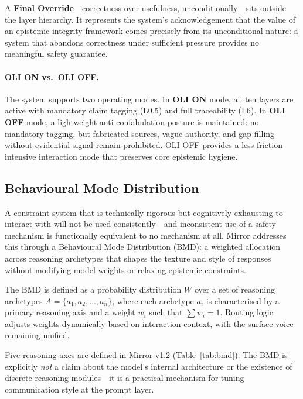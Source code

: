 \documentclass[11pt,a4paper]{article}
\begin{document}
A \textbf{Final Override}---correctness over usefulness, unconditionally---sits outside the layer hierarchy.
It represents the system's acknowledgement that the value of an epistemic integrity framework comes precisely from its unconditional nature: a system that abandons correctness under sufficient pressure provides no meaningful safety guarantee.

\paragraph{OLI ON vs.\ OLI OFF.}
The system supports two operating modes.
In \textbf{OLI ON} mode, all ten layers are active with mandatory claim tagging (L0.5) and full traceability (L6).
In \textbf{OLI OFF} mode, a lightweight anti-confabulation posture is maintained: no mandatory tagging, but fabricated sources, vague authority, and gap-filling without evidential signal remain prohibited.
OLI OFF provides a less friction-intensive interaction mode that preserves core epistemic hygiene.

\subsection{Behavioural Mode Distribution}
\label{sec:bmd}

A constraint system that is technically rigorous but cognitively exhausting to interact with will not be used consistently---and inconsistent use of a safety mechanism is functionally equivalent to no mechanism at all.
Mirror addresses this through a Behavioural Mode Distribution (BMD): a weighted allocation across reasoning archetypes that shapes the texture and style of responses without modifying model weights or relaxing epistemic constraints.

The BMD is defined as a probability distribution $W$ over a set of reasoning archetypes $A = \{a_1, a_2, \ldots, a_n\}$, where each archetype $a_i$ is characterised by a primary reasoning axis and a weight $w_i$ such that $\sum w_i = 1$.
Routing logic adjusts weights dynamically based on interaction context, with the surface voice remaining unified.

Five reasoning axes are defined in Mirror v1.2 (Table~\ref{tab:bmd}).
The BMD is explicitly \emph{not} a claim about the model's internal architecture or the existence of discrete reasoning modules---it is a practical mechanism for tuning communication style at the prompt layer.
\end{document}

